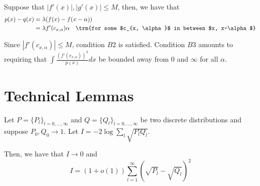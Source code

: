 \documentclass{article}
\begin{document}
Suppose that $|f'(x)|, |g'(x)| \leq M$, then, we have that
\begin{align*}
p(x) - q(x) &= \lambda (f(x) - f(x-\alpha)) \\
  &= \lambda f'(c_{x, \alpha}) \alpha \quad \trm{for some $c_{x, \alpha}$ in between $x, x-\alpha$}
\end{align*}

Since $|f'(c_{x, \alpha} )| \leq M$, condition $B2$ is satisfied. Condition $B3$ amounts to requiring that $\int \frac{(f'(c_{x, \alpha}))^2}{p(x)} dx $ be bounded away from 0 and $\infty$ for all $\alpha$. 


\newpage
\section{Technical Lemmas}

\begin{lemma}
\label{lem:simplify_renyi}
Let $P = \{ P_l \}_{l = 0,..., \infty}$ and $Q = \{ Q_l \}_{l=0,...,\infty}$ be two discrete distributions and suppose $P_0, Q_0 \rightarrow 1$. Let $I = - 2 \log \sum_l \sqrt{ P_l Q_l}$.

Then, we have that $I \rightarrow 0$ and 
\[
I = (1 + o(1)) \sum_{l = 1}^\infty (\sqrt{P_l} - \sqrt{Q_l})^2 
\]

\end{lemma}
\end{document}

